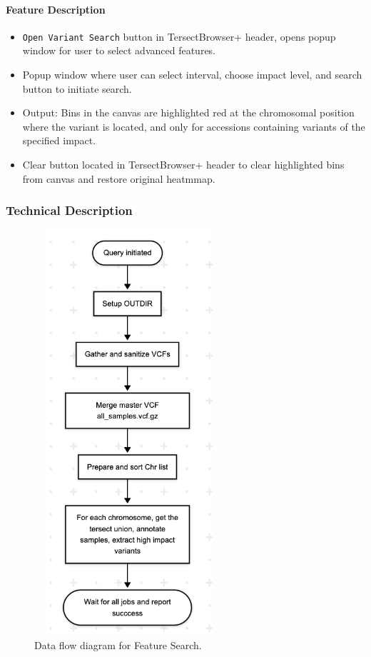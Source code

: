 \documentclass[12pt]{article}
\begin{document}
\paragraph{Feature Description}
\begin{itemize}
    \item \verb+Open Variant Search+ button in TersectBrowser+ header, opens popup window for user to select advanced features.
    \item Popup window where user can select interval, choose impact level, and search button to initiate search.
    \item Output: Bins in the canvas are highlighted red at the chromosomal position where the variant is located, and only for accessions containing variants of the specified impact.
    \item Clear button located in TersectBrowser+ header to clear highlighted bins from canvas and restore original heatmmap.
\end{itemize}
\subsubsection{Technical Description}

\begin{figure}[h]
    \centering
    \includegraphics[width=7cm, height=15cm]{FS2.png}
    \caption{Data flow diagram for Feature Search.}
\end{figure}
\end{document}
